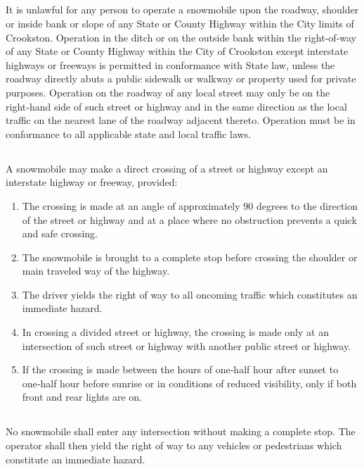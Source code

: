 \documentclass[code.tex]{subfiles}
\begin{document}
\subsection{}
It is unlawful for any person to operate a snowmobile upon the roadway, shoulder or inside bank or slope of any State or County Highway within the City limits of Crookston. Operation in the ditch or on the outside bank within the right‑of‑way of any State or County Highway within the City of Crookston except interstate highways or freeways is permitted in conformance with State law, unless the roadway directly abuts a public sidewalk or walkway or property used for private purposes. Operation on the roadway of any local street may only be on the right‑hand side of such street or highway and in the same direction as the local traffic on the nearest lane of the roadway adjacent thereto. Operation must be in conformance to all applicable state and local traffic laws.
\subsection{}
A snowmobile may make a direct crossing of a street or highway except an interstate highway or freeway, provided:
\begin{enumerate}
\item The crossing is made at an angle of approximately 90 degrees to the direction of the street or highway and at a place where no obstruction prevents a quick and safe crossing.
\item The snowmobile is brought to a complete stop before crossing the shoulder or main traveled way of the highway.
\item The driver yields the right of way to all oncoming traffic which constitutes an immediate hazard.
\item In crossing a divided street or highway, the crossing is made only at an intersection of such street or highway with another public street or highway.
\item If the crossing is made between the hours of one‑half hour after sunset to one‑half hour before sunrise or in conditions of reduced visibility, only if both front and rear lights are on.
\end{enumerate}
\subsection{}
No snowmobile shall enter any intersection without making a complete stop. The operator shall then yield the right of way to any vehicles or pedestrians which constitute an immediate hazard.
\end{document}

